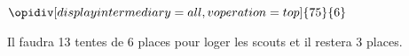 %
%
    $\opidiv[displayintermediary=all,voperation=top]{75}{6}$

    Il faudra 13 tentes de 6 places pour loger les scouts et il restera 3 places.

